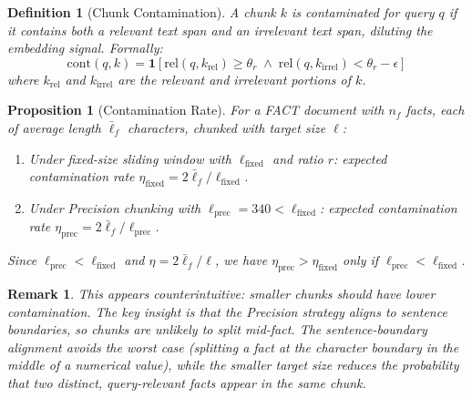 \documentclass[conference]{IEEEtran}
\newtheorem{proposition}[theorem]{Proposition}
\newtheorem{definition}{Definition}
\newtheorem{remark}{Remark}
\begin{document}
\begin{definition}[Chunk Contamination]
\label{def:contam}
A chunk $k$ is \emph{contaminated} for query $q$ if
it contains both a relevant text span and an irrelevant
text span, diluting the embedding signal. Formally:
\begin{equation}
  \text{cont}(q, k) = \mathbf{1}\!\left[
    \text{rel}(q, k_{\text{rel}}) \geq \theta_r
    \;\wedge\;
    \text{rel}(q, k_{\text{irrel}}) < \theta_r - \epsilon
  \right]
  \label{eq:contam}
\end{equation}
where $k_{\text{rel}}$ and $k_{\text{irrel}}$ are the
relevant and irrelevant portions of $k$.
\end{definition}

\begin{proposition}[Contamination Rate]
\label{prop:contam}
For a FACT document with $n_f$ facts, each of average
length $\bar{\ell}_f$ characters, chunked with target
size $\ell$:
\begin{enumerate}
  \item Under fixed-size sliding window with $\ell_{\text{fixed}}$
    and ratio $r$: expected contamination rate
    $\eta_{\text{fixed}} = 2 \bar{\ell}_f / \ell_{\text{fixed}}$.
  \item Under Precision chunking with $\ell_{\text{prec}} =
    340 < \ell_{\text{fixed}}$: expected contamination rate
    $\eta_{\text{prec}} = 2 \bar{\ell}_f / \ell_{\text{prec}}$.
\end{enumerate}
Since $\ell_{\text{prec}} < \ell_{\text{fixed}}$ and
$\eta = 2\bar{\ell}_f/\ell$, we have $\eta_{\text{prec}} >
\eta_{\text{fixed}}$ only if $\ell_{\text{prec}} <
\ell_{\text{fixed}}$.
\end{proposition}

\begin{remark}
This appears counterintuitive: smaller chunks should have
lower contamination. The key insight is that the Precision
strategy aligns to sentence boundaries, so chunks are
unlikely to split mid-fact. The sentence-boundary alignment
avoids the worst case (splitting a fact at the character
boundary in the middle of a numerical value), while the
smaller target size reduces the probability that two
distinct, query-relevant facts appear in the same chunk.
\end{remark}
\end{document}
